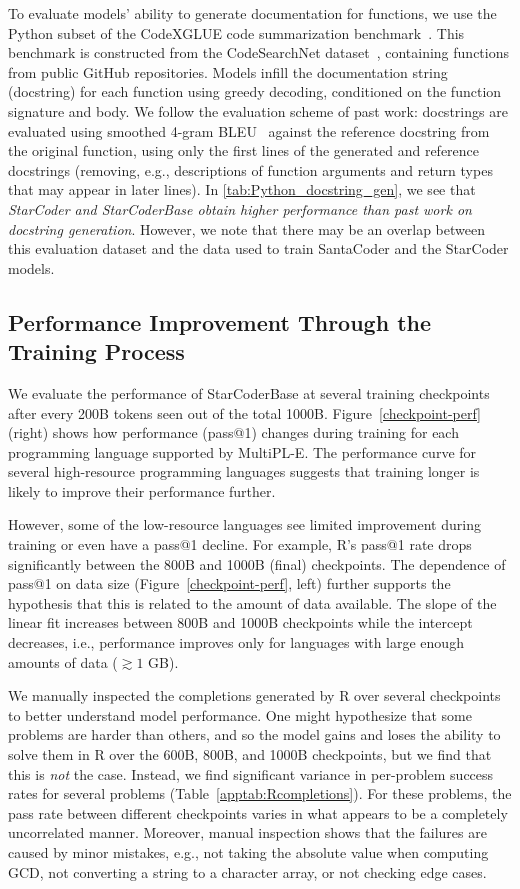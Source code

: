 To evaluate models' ability to generate documentation for functions, we use the Python subset of the CodeXGLUE code summarization benchmark~\citep{lu2021codexglue}. This benchmark is constructed from the CodeSearchNet dataset~\citep{husain2019codesearchnet}, containing functions from public GitHub repositories. Models infill the documentation string (docstring) for each function using greedy decoding, conditioned on the function signature and body. We follow the evaluation scheme of past work: docstrings are evaluated using smoothed 4-gram BLEU~\citep{papineni2002bleu} against the reference docstring from the original function, using only the first lines of the generated and reference docstrings (removing, e.g., descriptions of function arguments and return types that may appear in later lines). In \autoref{tab:Python_docstring_gen}, we see that \emph{StarCoder and StarCoderBase obtain higher performance than past work on docstring generation}. However, we note that there may be an overlap between this evaluation dataset and the data used to train SantaCoder and the StarCoder models.

\subsection{Performance Improvement Through the Training Process}

We evaluate the performance of StarCoderBase at several training checkpoints after every 200B tokens seen out of the total 1000B. Figure~\ref{checkpoint-perf} (right) shows how performance (pass@1) changes during training for each programming language supported by MultiPL-E. The performance curve for several high-resource programming languages suggests that training longer is likely to improve their performance further. 

However, some of the low-resource languages see limited improvement during training or even have a pass@1 decline. For example, R's pass@1 rate drops significantly between the 800B and 1000B (final) checkpoints. The dependence of pass@1 on data size (Figure~\ref{checkpoint-perf}, left) further supports the hypothesis that this is related to the amount of data available. The slope of the linear fit increases between 800B and 1000B checkpoints while the intercept decreases, i.e.,  performance improves only for languages with large enough amounts of data ($\gtrsim 1$ GB).

We manually inspected the completions generated by R over several checkpoints to better understand model performance. One might hypothesize that some problems are harder than others, and so the model gains and loses the ability to solve them in R over the 600B, 800B, and 1000B checkpoints, but we find that this is \emph{not} the case. Instead, we find significant variance in per-problem success rates for several problems (Table~\ref{apptab:Rcompletions}).
For these problems, the pass rate between different checkpoints varies in what appears to be a completely uncorrelated manner. Moreover, manual inspection shows that the failures are caused by minor mistakes,  e.g., not taking the absolute value when computing GCD, not converting a string to a character array, or not checking edge cases. 

